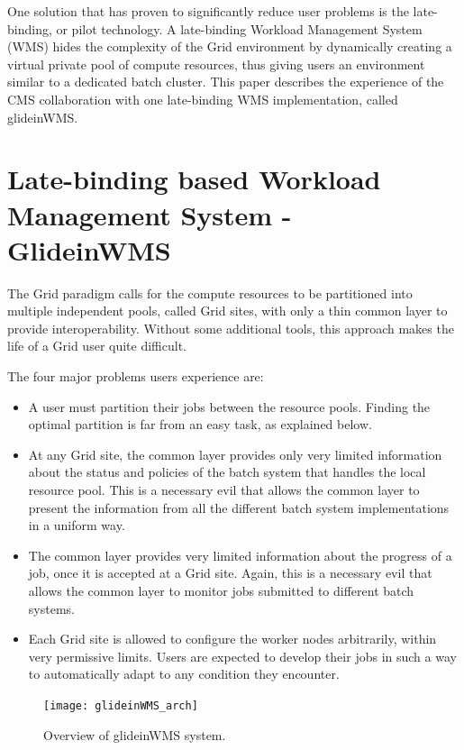 \documentclass[a4paper]{jpconf}
\begin{document}
One solution that has proven to significantly reduce user problems is the late-binding, or pilot technology.  
A late-binding Workload Management System (WMS) hides the complexity of the Grid environment by dynamically creating 
a virtual private pool of compute resources, thus giving users an environment similar to a dedicated batch cluster.
This paper describes the experience of the CMS collaboration with one late-binding WMS implementation, called glideinWMS. 
\section{Late-binding based Workload Management System - GlideinWMS }
The Grid paradigm calls for the compute resources to be partitioned into multiple independent pools, called Grid sites,
with only a thin common layer to provide interoperability.
Without some additional tools, this approach makes the life of a Grid user quite difficult. 

The four major problems users experience are:
\begin {itemize}
\item 
A user must partition their jobs between the resource pools.
Finding the optimal partition is far from an easy task, as explained below.
\item
At any Grid site, the common layer provides only very limited information about the status and policies of the
batch system that handles the local resource pool.
This is a necessary evil that allows the common layer to present the information from all the different batch system 
implementations in a uniform way. 
\item 
The common layer provides very limited information about the progress of a job, once it is accepted at a Grid site.
Again, this is a necessary evil that allows the common layer to monitor jobs submitted to different batch systems.  
\item
Each Grid site is allowed to configure the worker nodes arbitrarily, within very permissive limits.
Users are expected to develop their jobs in such a way to automatically adapt to any condition they encounter.
\end{itemize}
\begin{figure}
\begin{center}
\texttt{[image: glideinWMS\_arch]}
\end{center}
\caption{Overview of glideinWMS system.}
\label{fig:glideinWMS}
\end{figure}
\end{document}
